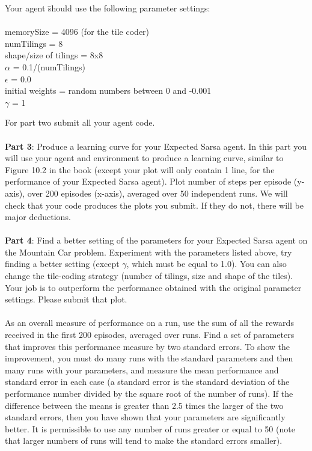 \documentclass[10pt]{article}
\begin{document}
\begin{tabbing}
Your agent \= should use the following parameter settings:\\\\ 
\>memorySize = 4096 (for the tile coder)\\
\>numTilings = 8 \\
\>shape/size of tilings = 8x8\\
\>$\alpha$ = 0.1/(numTilings)\\
\>$\epsilon$ = 0.0\\
\>initial weights = random numbers between 0 and -0.001\\
\>$\gamma$ = 1
\end{tabbing}

For part two submit all your agent code.
\\\\
{\bf Part 3}: Produce a learning curve for your Expected Sarsa agent. In this part you will use your agent and environment to produce a learning curve, similar to Figure 10.2 in the book (except your plot will only contain 1 line, for the performance of your Expected Sarsa agent). Plot number of steps per episode (y-axis), over 200 episodes (x-axis), averaged over 50 independent runs. We will check that your code produces the plots you submit. If they do not, there will be major deductions.
\\\\
{\bf Part 4}: Find a better setting of the parameters for your Expected Sarsa agent on the Mountain Car problem. Experiment with the parameters listed above, try finding a better setting (except $\gamma$, which must be equal to 1.0). You can also change the tile-coding strategy (number of tilings, size and shape of the tiles). Your job is to outperform the performance obtained with the original parameter settings. Please submit that plot.
\\\\
As an overall measure of performance on a run, use the sum of all the rewards received in the first 200 episodes, averaged over runs. Find a set of parameters that improves this performance measure by two standard errors. To show the improvement, you must do many runs with the standard parameters and then many runs with your parameters, and measure the mean performance and standard error in each case (a standard error is the standard deviation of the performance number divided by the square root of the number of runs). If the difference between the means is greater than 2.5 times the larger of the two standard errors, then you have shown that your parameters are significantly better. It is permissible to use any number of runs greater or equal to 50 (note that larger numbers of runs will tend to make the standard errors smaller). 
\end{document}
